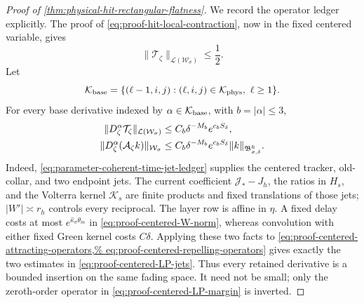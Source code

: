 \begin{proof}[Proof of
\cref{thm:physical-hit-rectangular-flatness}]
We record the operator ledger explicitly.  The proof of
\cref{eq:proof-hit-local-contraction}, now in the fixed centered variable,
gives
\begin{equation}
 \|\mathcal T_\zeta\|_{\mathcal L(\mathcal W_\sigma)}\le\frac12.
                                                               \label{eq:proof-centered-LP-margin}
\end{equation}
Let
\begin{equation}
 \mathcal K_{\rm base}
 =\{(\ell-1,i,j):(\ell,i,j)\in\mathcal K_{\rm phys},
                         \ \ell\ge1\}.            \label{eq:proof-centered-base-staircase}
\end{equation}
For every base derivative indexed by
$\alpha\in\mathcal K_{\rm base}$, with $b=|\alpha|\le3$,
\begin{align}
 \|D_\zeta^\alpha\mathcal T_\zeta\|_{
       \mathcal L(\mathcal W_\sigma)}
 &\le C_b\delta^{-M_b}e^{c_bS_\delta},\notag\\
 \|D_\zeta^\alpha(\mathcal A_\zeta k)\|_{\mathcal W_\sigma}
 &\le C_b\delta^{-M_b}e^{c_bS_\delta}
       \|k\|_{\mathfrak B_{\sigma,\delta}^h}.  \label{eq:proof-centered-LP-jets}
\end{align}
Indeed, \cref{eq:parameter-coherent-time-jet-ledger} supplies the centered
tracker, old-collar, and two endpoint jets.  The current coefficient
$\mathcal J_*-J_h$, the ratios in $H_s$, and the Volterra kernel
$\mathcal K_s$ are finite products and fixed translations of those jets;
$|W'|\asymp r_h$ controls every reciprocal.  The layer row is affine in
$\eta$.  A fixed delay costs at most
$e^{\widehat\kappa_\sigma\theta_m}$ in
\cref{eq:proof-centered-W-norm}, whereas convolution with either fixed
Green kernel costs $C\delta$.  Applying these two facts to
\cref{eq:proof-centered-attracting-operators,%
eq:proof-centered-repelling-operators} gives exactly the two estimates in
\cref{eq:proof-centered-LP-jets}.  Thus every retained derivative is a
bounded insertion on the same fading space.  It need not be small; only the
zeroth-order operator in
\cref{eq:proof-centered-LP-margin} is inverted.


\end{proof}
